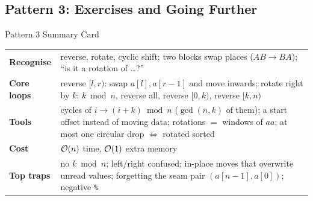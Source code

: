 \subsection{Pattern 3: Exercises and Going Further}
\label{ssec:ch1-p3-ex}

\begin{patternbox}{Pattern 3 Summary Card}
\begin{tabularx}{\linewidth}{@{}>{\bfseries}l X@{}}
Recognise & reverse, rotate, cyclic shift; two blocks swap places ($AB \to BA$); ``is it a rotation of \ldots?'' \\
Core loops & reverse $[l,r)$: swap $a[l], a[r-1]$ and move inwards; rotate right by $k$: $k \bmod n$, reverse all, reverse $[0,k)$, reverse $[k,n)$ \\
Tools & cycles of $i \to (i+k) \bmod n$ ($\gcd(n,k)$ of them); a start offset instead of moving data; rotations $=$ windows of $aa$; at most one circular drop $\iff$ rotated sorted \\
Cost & $\mathcal{O}(n)$ time, $\mathcal{O}(1)$ extra memory \\
Top traps & no $k \bmod n$; left/right confused; in-place moves that overwrite unread values; forgetting the seam pair $(a[n-1], a[0])$; negative \texttt{\%} \\
\end{tabularx}
\end{patternbox}

